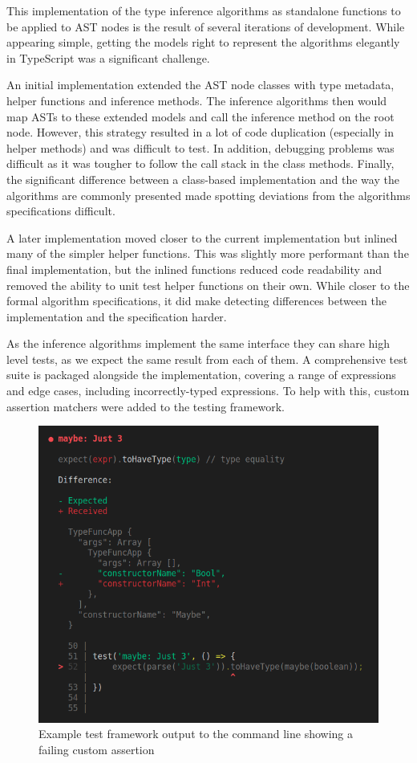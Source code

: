 \documentclass[a4paper,fleqn,oneside,12pt]{report}
\begin{document}
This implementation of the type inference algorithms as standalone functions to be applied to AST nodes is the result of several iterations of development. While appearing simple, getting the models right to represent the algorithms elegantly in TypeScript was a significant challenge.

An initial implementation extended the AST node classes with type metadata, helper functions and inference methods. The inference algorithms then would map ASTs to these extended models and call the inference method on the root node. However, this strategy resulted in a lot of code duplication (especially in helper methods) and was difficult to test. In addition, debugging problems was difficult as it was tougher to follow the call stack in the class methods. Finally, the significant difference between a class-based implementation and the way the algorithms are commonly presented made spotting deviations from the algorithms specifications difficult.

A later implementation moved closer to the current implementation but inlined many of the simpler helper functions. This was slightly more performant than the final implementation, but the inlined functions reduced code readability and removed the ability to unit test helper functions on their own. While closer to the formal algorithm specifications, it did make detecting differences between the implementation and the specification harder.

As the inference algorithms implement the same interface they can share high level tests, as we expect the same result from each of them. A comprehensive test suite is packaged alongside the implementation, covering a range of expressions and edge cases, including incorrectly-typed expressions. To help with this, custom assertion matchers were added to the testing framework.

{\centering \begin{figure}[h!]
  \centering
  \includegraphics[width=0.769\linewidth]{images/image9.png}
  \caption{Example test framework output to the command line showing a failing custom assertion}
\end{figure} \par}
\end{document}
